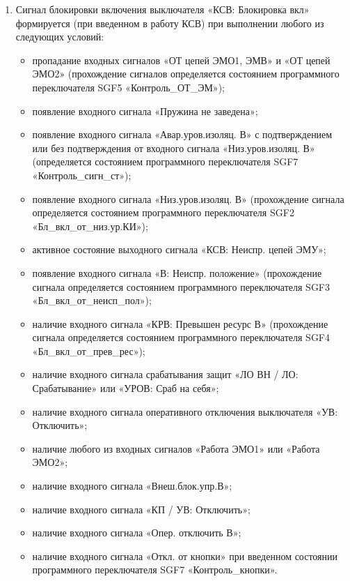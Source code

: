\begin{enumerate}
\item
Сигнал блокировки включения выключателя «КСВ: Блокировка вкл» формируется (при введенном в работу КСВ) при выполнении любого из следующих условий:
\begin{itemize}
\sloppy
\item пропадание входных сигналов «ОТ цепей ЭМО1, ЭМВ» и «ОТ цепей ЭМО2» (прохождение сигналов определяется состоянием программного переключателя SGF5 «Контроль\_ОТ\_ЭМ»);
\item появление входного сигнала «Пружина не заведена»;
\item появление входного сигнала «Авар.уров.изоляц. В» с подтверждением или без подтверждения от входного сигнала «Низ.уров.изоляц. В» (определяется состоянием программного переключателя SGF7 «Контроль\_сигн\_ст»);
\item появление входного сигнала «Низ.уров.изоляц. В» (прохождение сигнала определяется состоянием программного переключателя SGF2 «Бл\_вкл\_от\_низ.ур.КИ»);
\item активное состояние выходного сигнала «КСВ: Неиспр. цепей ЭМУ»;
\item появление входного сигнала «В: Неиспр. положение» (прохождение сигнала определяется состоянием программного переключателя SGF3 «Бл\_вкл\_от\_неисп\_пол»);
\item наличие входного сигнала «КРВ: Превышен ресурс В» (прохождение сигнала определяется состоянием программного переключателя SGF4 «Бл\_вкл\_от\_прев\_рес»);
\item наличие входного сигнала срабатывания защит «ЛО ВН / ЛО: Срабатывание» или «УРОВ: Сраб на себя»;
\item наличие входного сигнала оперативного отключения выключателя «УВ: Отключить»;
\item наличие любого из входных сигналов «Работа ЭМО1» или «Работа ЭМО2»;
\item наличие входного сигнала «Внеш.блок.упр.В»;
\item наличие входного сигнала «КП / УВ: Отключить»;
\item наличие входного сигнала «Опер. отключить В»;
\item наличие входного сигнала «Откл. от кнопки» при введенном состоянии программного переключателя SGF7 «Контроль\_кнопки».
\end{itemize}


\end{enumerate}
